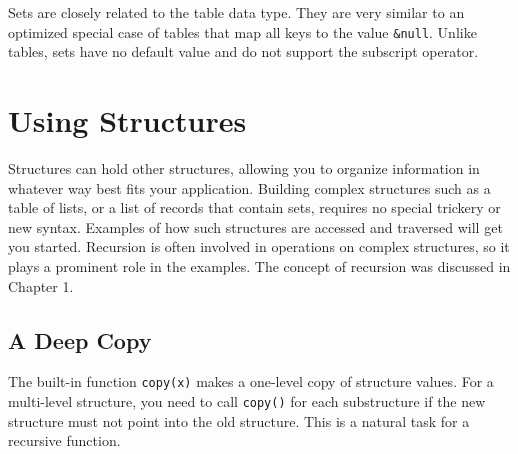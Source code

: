 
Sets are closely related to the table data type. They are very similar
to an optimized special case of tables that map all keys to the value
\texttt{\&null}. Unlike tables, sets have no default value and do not
support the subscript operator.

\section{Using Structures}

Structures can hold other structures, allowing you to
organize information in whatever way best fits your application.
Building complex structures such as a table of lists, or a list
of records that contain sets, requires no special trickery or new
syntax. Examples of how such structures are accessed and
traversed will get you started. Recursion is often
involved in operations on complex structures, so it plays a prominent
role in the examples. The concept of recursion was discussed in Chapter
1.

\subsection*{A Deep Copy}

The built-in function \texttt{copy(x)} makes a one-level
copy of structure values. For a multi-level structure, you need to call
\texttt{copy()} for each substructure if the new structure must not
point into the old structure. This is a natural task for
a recursive function.


